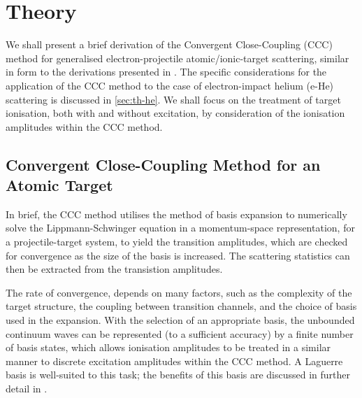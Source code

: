 \documentclass[]{article}
\begin{document}






\clearpage

\section{Theory}
\label{sec:th}

We shall present a brief derivation of the Convergent Close-Coupling (CCC)
method for generalised electron-projectile atomic/ionic-target scattering,
similar in form to the derivations presented in \cite{BRAY19951, AJP_BRAY1996}.
The specific considerations for the application of the CCC method to the case of
electron-impact helium (e-He) scattering is discussed in \autoref{sec:th-he}.
We shall focus on the treatment of target ionisation, both with and without
excitation, by consideration of the ionisation amplitudes within the CCC method.

\subsection{Convergent Close-Coupling Method for an Atomic Target}
\label{sec:th-ccc}

In brief, the CCC method utilises the method of basis expansion to numerically
solve the Lippmann-Schwinger equation in a momentum-space representation, for a
projectile-target system, to yield the transition amplitudes, which are checked
for convergence as the size of the basis is increased.
The scattering statistics can then be extracted from the transistion amplitudes.

The rate of convergence, depends on many factors, such as the complexity of the
target structure, the coupling between transition channels, and the choice of
basis used in the expansion.
With the selection of an appropriate basis, the unbounded continuum waves can be
represented (to a sufficient accuracy) by a finite number of basis states, which
allows ionisation amplitudes to be treated in a similar manner to discrete
excitation amplitudes within the CCC method.
A Laguerre basis is well-suited to this task; the benefits of this basis are
discussed in further detail in \cite[5-9]{BRAY19951}.
\end{document}
